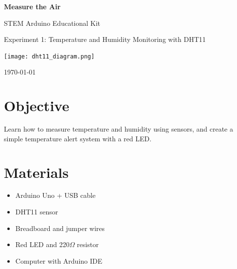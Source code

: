 \documentclass[11pt]{article}
\begin{document}
\begin{titlepage}
    \centering
    \vspace*{4cm}
    {\Huge \bfseries Measure the Air \par}
    \vspace{1cm}
    {\LARGE STEM Arduino Educational Kit\par}
    \vspace{1cm}
    {\Large Experiment 1: Temperature and Humidity Monitoring with DHT11\par}
    \vfill
    \texttt{[image: dht11\_diagram.png]}\par
    \vspace{2cm}
    {\large \today\par}
\end{titlepage}

\section*{Objective}
Learn how to measure temperature and humidity using sensors, and create a simple temperature alert system with a red LED.

\section*{Materials}
\begin{itemize}
    \item Arduino Uno + USB cable
    \item DHT11 sensor
    \item Breadboard and jumper wires
    \item Red LED and 220$\Omega$ resistor
    \item Computer with Arduino IDE
\end{itemize}
\end{document}
